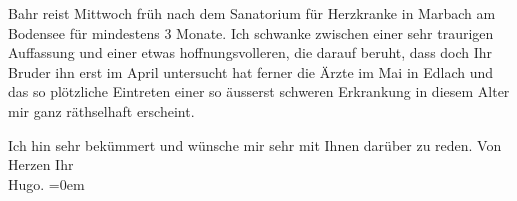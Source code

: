 \pstart
           Bahr reist Mittwoch früh nach dem Sanatorium für Herzkranke in Marbach am Bodensee
               für mindestens 3 Monate. Ich schwanke zwischen einer sehr traurigen Auffassung und
               einer etwas hoffnungsvolleren, die darauf beruht, dass doch Ihr Bruder ihn {\pb}erst im April
               untersucht hat ferner die Ärzte im Mai in Edlach und das so plötzliche Eintreten einer so äusserst schweren Erkrankung
               in diesem Alter mir ganz räthselhaft erscheint.\pend
           
\pstart
           Ich hin sehr bekümmert und wünsche mir sehr mit Ihnen darüber zu reden. Von
               Herzen Ihr{\\[\baselineskip]}\spacefill\mbox{Hugo.}\pend
           \leftskip=0em{}\endnumbering{}  \newcommand{\dateiname}{L01361}\newcommand{\titel}{Hugo von Hofmannsthal an Arthur Schnitzler, [8. – 9. 1. 1904]}\newcommand{\editorInnen}{Herausgegeben von Martin Anton Müller}

